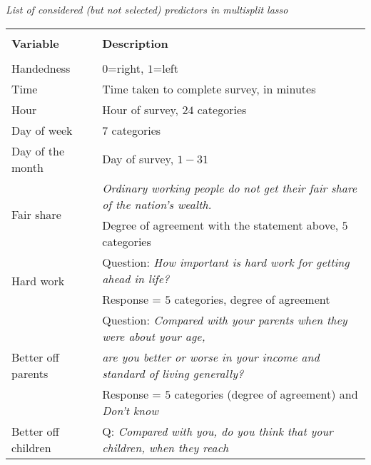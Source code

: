 \documentclass[a4paper,12pt]{article}
\begin{document}
{\centering
\begin{threeparttable}
\caption{\textit{\vspace{-0.3cm}List of considered (but not selected) predictors in multisplit lasso}}
\label{PotentialPredictors2} 
\centering
\begin{small}
\begin{tabular}{ll} 
\hline \vspace{-0.25cm} \\	
  \multicolumn{1}{l}{\vspace{0.1cm}\textbf{Variable}}&   \multicolumn{1}{l}{\vspace{0.1cm}\textbf{Description}}   \\ 
\hline \vspace{-0.35cm}\\ 
\vspace{0.14cm}Handedness& $0$=right, $1$=left \\
\vspace{0.14cm}Time&Time taken to complete survey, in minutes\\
\vspace{0.14cm}Hour&Hour of survey, $24$ categories\\
\vspace{0.14cm}Day of week&$7$ categories\\
\vspace{0.14cm}Day of the month&Day of survey, $1-31$\\
\multirow{2}{*}{Fair share}&\textit{Ordinary working people do not get their fair share of the nation's wealth.}\\
\vspace{0.14cm}&Degree of agreement with the statement above, $5$ categories\\
\multirow{2}{*}{Hard work}&Question: \textit{How important is hard work for getting ahead in life?}\\
\vspace{0.14cm}&Response = $5$ categories, degree of agreement\\
\multirow{3}{*}{Better off parents}&Question: \textit{Compared with your parents when they were about your age, }\\
&\textit{are you better or worse in your income and standard of living generally?}\\
\vspace{0.14cm}&Response = $5$ categories (degree of agreement)  and \textit{Don't know}\\
\multirow{3}{*}{Better off children}&Q: \textit{Compared with you, do you think that your children, when they reach}\\

\end{tabular}
\end{small}
\end{threeparttable}}
\end{document}
